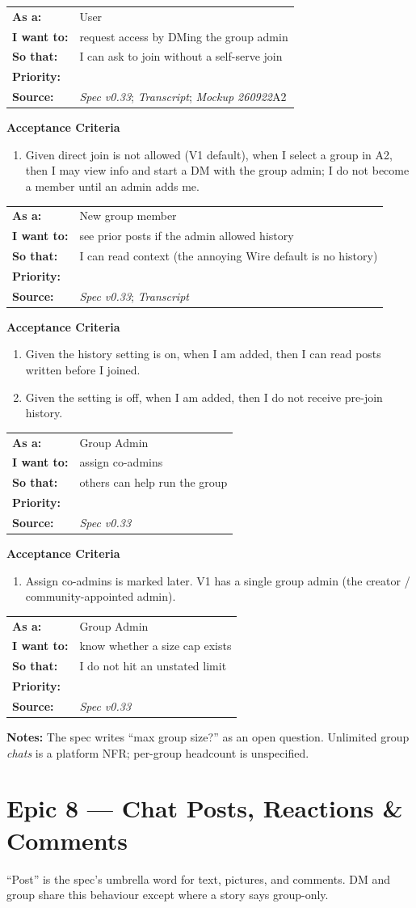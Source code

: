 \documentclass[11pt,a4paper]{article}
\makeatletter
\newcommand{\priPzero}{\colorbox{p0}{\makebox[4.6em]{\textcolor{white}{\scriptsize\bfseries P0 V1}}}}
\newcommand{\priPtwo}{\colorbox{p2}{\makebox[4.6em]{\textcolor{white}{\scriptsize\bfseries P2 Later}}}}
\newcommand{\priTBD}{\colorbox{tbd}{\makebox[4.6em]{\textcolor{white}{\scriptsize\bfseries TBD}}}}
\newcommand{\srcSpec}{\textit{Spec v0.33}}
\newcommand{\srcTx}{\textit{Transcript}}
\newcommand{\srcMock}{\textit{Mockup 260922}}
\newenvironment{story}[1]{%
  \Needspace{10\baselineskip}%
  \vspace{0.7em}%
  \noindent
  \colorbox{navy}{\makebox[\dimexpr\textwidth-2\fboxsep\relax][l]{\textcolor{white}{\bfseries\ #1}}}%
  \par\vspace{0.35em}%
}{\par\vspace{0.55em}}
\newcommand{\storymeta}[5]{%
  \noindent
  \begin{tabularx}{\textwidth}{@{}>{\bfseries}l X@{}}
    As a: & #1 \\
    I want to: & #2 \\
    So that: & #3 \\
    Priority: & #4 \\
    Source: & #5 \\
  \end{tabularx}
  \par\vspace{0.3em}
}
\newcommand{\achead}{\noindent\textbf{Acceptance Criteria}\par}
\newcommand{\notes}[1]{\noindent\textbf{Notes:} #1\par}
\makeatother
\begin{document}
\begin{story}{GROUP-013 --- Join by messaging the group admin (V1 default)}
\storymeta{User}{request access by DMing the group admin}{I can ask to join without a self-serve join}{\priPzero}{\srcSpec; \srcTx; \srcMock A2}
\achead
\begin{enumerate}
  \item Given direct join is not allowed (V1 default), when I select a group in A2, then I may view info and start a DM with the group admin; I do not become a member until an admin adds me.
\end{enumerate}
\end{story}

\begin{story}{GROUP-014 --- History visible to new members when allowed}
\storymeta{New group member}{see prior posts if the admin allowed history}{I can read context (the annoying Wire default is no history)}{\priPzero}{\srcSpec; \srcTx}
\achead
\begin{enumerate}
  \item Given the history setting is on, when I am added, then I can read posts written before I joined.
  \item Given the setting is off, when I am added, then I do not receive pre-join history.
\end{enumerate}
\end{story}

\begin{story}{GROUP-015 --- Co-admins}
\storymeta{Group Admin}{assign co-admins}{others can help run the group}{\priPtwo}{\srcSpec}
\achead
\begin{enumerate}
  \item Assign co-admins is marked later. V1 has a single group admin (the creator / community-appointed admin).
\end{enumerate}
\end{story}

\begin{story}{GROUP-016 --- Maximum group size}
\storymeta{Group Admin}{know whether a size cap exists}{I do not hit an unstated limit}{\priTBD}{\srcSpec}
\notes{The spec writes ``max group size?'' as an open question. Unlimited group \emph{chats} is a platform NFR; per-group headcount is unspecified.}
\end{story}

\section{Epic 8 --- Chat Posts, Reactions \& Comments}
``Post'' is the spec's umbrella word for text, pictures, and comments. DM and group share this behaviour except where a story says group-only.
\end{document}
